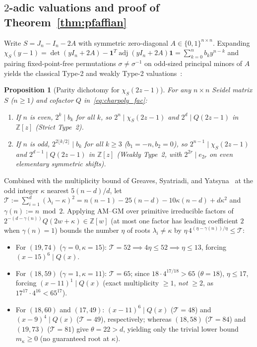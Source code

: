 \documentclass[11pt,reqno]{amsart}
\newtheorem{proposition}[theorem]{Proposition}
\theoremstyle{definition}
\theoremstyle{remark}
\DeclareMathOperator{\adj}{adj}
\begin{document}
\subsection{\texorpdfstring{$2$-adic valuations and proof of Theorem~\ref{thm:pfaffian}}{2-adic valuations and proof of Theorem 1.4}}
Write $S = J_n - I_n - 2A$ with symmetric zero-diagonal $A \in \{0, 1\}^{n \times n}$. Expanding $\chi_S(y - 1) = \det(yI_n + 2A) - \mathbf{1}^T \adj(yI_n + 2A)\mathbf{1} = \sum_{k=0}^n b_k y^{n-k}$ and pairing fixed-point-free permutations $\sigma \neq \sigma^{-1}$ on odd-sized principal minors of $A$ yields the classical Type-2 and weakly Type-2 valuations~\cite{GY2019,GSY2021}:

\begin{proposition}[Parity dichotomy for $\chi_S(2z - 1)$]\label{prop:twoadic_val}
For any $n \times n$ Seidel matrix $S$ ($n \ge 1$) and cofactor $Q$ in~\eqref{eq:charpoly_fac}:
\begin{enumerate}
  \item If $n$ is even, $2^k \mid b_k$ for all $k$, so $2^n \mid \chi_S(2z - 1)$ and $2^d \mid Q(2z - 1)$ in $\mathbb{Z}[z]$ (\emph{Strict Type~2}).
  \item If $n$ is odd, $2^{2\lfloor k/2 \rfloor} \mid b_k$ for all $k \ge 3$ ($b_1 = -n, b_2 = 0$), so $2^{n-1} \mid \chi_S(2z - 1)$ and $2^{d-1} \mid Q(2z - 1)$ in $\mathbb{Z}[z]$ (\emph{Weakly Type~2}, with $2^{2r} \mid e_{2r}$ on even elementary symmetric shifts).
\end{enumerate}
\end{proposition}

Combined with the multiplicity bound of Greaves, Syatriadi, and Yatsyna~\cite[Lem.~3.1]{GSY2021} at the odd integer $\kappa$ nearest $5(n-d)/d$, let $\mathcal{T} := \sum_{i=1}^d (\lambda_i - \kappa)^2 = n(n-1) - 25(n-d) - 10\kappa(n-d) + d\kappa^2$ and $\gamma(n) := n \bmod 2$. Applying AM--GM over primitive irreducible factors of $2^{-(d-\gamma(n))} Q(2w + \kappa) \in \mathbb{Z}[w]$ (at most one factor has leading coefficient $2$ when $\gamma(n) = 1$) bounds the number $\eta$ of roots $\lambda_i \neq \kappa$ by $\eta\,4^{(\eta - \gamma(n))/\eta} \le \mathcal{T}$:
\begin{itemize}
  \item For $(19, 74)$ ($\gamma = 0, \kappa = 15$): $\mathcal{T} = 52 \implies 4\eta \le 52 \implies \eta \le 13$, forcing $(x - 15)^6 \mid Q(x)$.
  \item For $(18, 59)$ ($\gamma = 1, \kappa = 11$): $\mathcal{T} = 65$; since $18 \cdot 4^{17/18} > 65$ ($\theta = 18$), $\eta \le 17$, forcing $(x - 11)^1 \mid Q(x)$ (exact multiplicity $\ge 1$, \emph{not} $\ge 2$, as $17^{17} \cdot 4^{16} < 65^{17}$).
  \item For $(18, 60)$ and $(17, 49)$: $(x - 11)^6 \mid Q(x)$ ($\mathcal{T} = 48$) and $(x - 9)^4 \mid Q(x)$ ($\mathcal{T} = 49$), respectively; whereas $(18, 58)$ ($\mathcal{T} = 84$) and $(19, 73)$ ($\mathcal{T} = 81$) give $\theta = 22 > d$, yielding only the trivial lower bound $m_\kappa \ge 0$ (no guaranteed root at $\kappa$).
\end{itemize}
\end{document}
